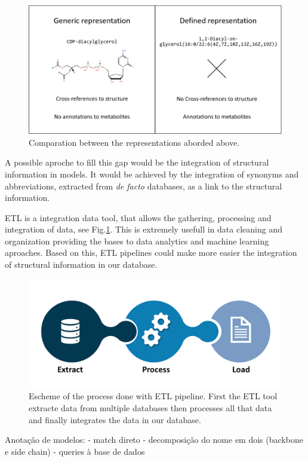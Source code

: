 \documentclass{llncs}
\begin{document}
\begin{figure}
    \includegraphics[width=\textwidth]{imagens/comparação.png}
    \caption{Comparation between the representations aborded above.}
\end{figure}

A possible aproche to fill this gap would be the integration of structural information in models. 
It would be achieved by the integration of synonyms and abbreviations, extracted from \textit{de facto} databases, as a link to the structural information.

ETL is a integration data tool, that allows the gathering, processing and integration of data, see Fig.\ref{fig4}. 
This is extremely usefull in data cleaning and organization providing the bases to data analytics and machine learning aproaches. 
Based on this, ETL pipelines could make more easier the integration of structural information in our database.

\begin{figure}
    \includegraphics[width=\textwidth]{imagens/ETL.png}
    \caption{Escheme of the process done with ETL pipeline.
    First the ETL tool extracte data from multiple databases
    then processes all that data
    and finally integrates the data in our database.} \label{fig4}    
\end{figure}

Anotação de modelos:
    - match direto
    - decomposição do nome em dois (backbone e side chain) - queries à base de dados





\end{document}
